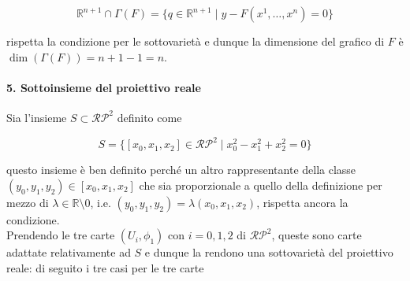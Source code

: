\begin{equation}
	\mathbb{R}^{n+1} \cap \Gamma(F) = \{ q \in \mathbb{R}^{n+1} \mid y - F(x^{1},\dots,x^{n}) = 0 \}
\end{equation}

rispetta la condizione per le sottovarietà e dunque la dimensione del grafico di $ F $ è $ \dim(\Gamma(F)) = n+1-1 = n $.

\paragraph{5. Sottoinsieme del proiettivo reale}

Sia l'insieme $ S \subset \mathcal{RP}^{2} $ definito come

\begin{equation}
	S = \{ [x_{0},x_{1},x_{2}] \in \mathcal{RP}^{2} \mid x_{0}^{2} - x_{1}^{2} + x_{2}^{2} = 0 \}
\end{equation}

questo insieme è ben definito perché un altro rappresentante della classe $ (y_{0},y_{1},y_{2}) \in [x_{0},x_{1},x_{2}] $ che sia proporzionale a quello della definizione per mezzo di $ \lambda \in \mathbb{R} \setminus 0 $, i.e. $ (y_{0},y_{1},y_{2}) = \lambda (x_{0},x_{1},x_{2}) $, rispetta ancora la condizione.\\
Prendendo le tre carte $ (U_{i},\phi_{1}) $ con $ i=0,1,2 $ di $ \mathcal{RP}^{2} $, queste sono carte adattate relativamente ad $ S $ e dunque la rendono una sottovarietà del proiettivo reale: di seguito i tre casi per le tre carte

